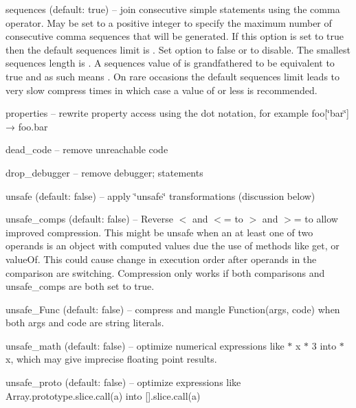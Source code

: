 \begin{DoxyItemize}
\item {\ttfamily sequences} (default\+: true) -- join consecutive simple statements using the comma operator. May be set to a positive integer to specify the maximum number of consecutive comma sequences that will be generated. If this option is set to {\ttfamily true} then the default {\ttfamily sequences} limit is {}. Set option to {\ttfamily false} or {} to disable. The smallest {\ttfamily sequences} length is {}. A {\ttfamily sequences} value of {} is grandfathered to be equivalent to {\ttfamily true} and as such means {}. On rare occasions the default sequences limit leads to very slow compress times in which case a value of {} or less is recommended.
\item {\ttfamily properties} -- rewrite property access using the dot notation, for example {\ttfamily foo\mbox{[}\char`\"{}bar\char`\"{}\mbox{]} → foo.\+bar}
\item {\ttfamily dead\+\_\+code} -- remove unreachable code
\item {\ttfamily drop\+\_\+debugger} -- remove {\ttfamily debugger;} statements
\item {\ttfamily unsafe} (default\+: false) -- apply \char`\"{}unsafe\char`\"{} transformations (discussion below)
\item {\ttfamily unsafe\+\_\+comps} (default\+: false) -- Reverse {\ttfamily $<$} and {\ttfamily $<$=} to {\ttfamily $>$} and {\ttfamily $>$=} to allow improved compression. This might be unsafe when an at least one of two operands is an object with computed values due the use of methods like {\ttfamily get}, or {\ttfamily value\+Of}. This could cause change in execution order after operands in the comparison are switching. Compression only works if both {\ttfamily comparisons} and {\ttfamily unsafe\+\_\+comps} are both set to true.
\item {\ttfamily unsafe\+\_\+\+Func} (default\+: false) -- compress and mangle {\ttfamily Function(args, code)} when both {\ttfamily args} and {\ttfamily code} are string literals.
\item {\ttfamily unsafe\+\_\+math} (default\+: false) -- optimize numerical expressions like { $\ast$ x $\ast$ 3} into { $\ast$ x}, which may give imprecise floating point results.
\item {\ttfamily unsafe\+\_\+proto} (default\+: false) -- optimize expressions like {\ttfamily Array.\+prototype.\+slice.\+call(a)} into {\ttfamily \mbox{[}\mbox{]}.slice.\+call(a)}

\end{DoxyItemize}
